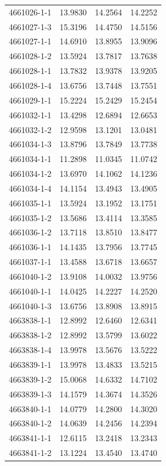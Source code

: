 \begin{longtable}{lrrr}
4661026-1-1 & 13.9830 & 14.2564 & 14.2252 \\
4661027-1-3 & 15.3196 & 14.4750 & 14.5156 \\
4661027-1-1 & 14.6910 & 13.8955 & 13.9096 \\
4661028-1-2 & 13.5924 & 13.7817 & 13.7638 \\
4661028-1-1 & 13.7832 & 13.9378 & 13.9205 \\
4661028-1-4 & 13.6756 & 13.7448 & 13.7551 \\
4661029-1-1 & 15.2224 & 15.2429 & 15.2454 \\
4661032-1-1 & 13.4298 & 12.6894 & 12.6653 \\
4661032-1-2 & 12.9598 & 13.1201 & 13.0481 \\
4661034-1-3 & 13.8796 & 13.7849 & 13.7738 \\
4661034-1-1 & 11.2898 & 11.0345 & 11.0742 \\
4661034-1-2 & 13.6970 & 14.1062 & 14.1236 \\
4661034-1-4 & 14.1154 & 13.4943 & 13.4905 \\
4661035-1-1 & 13.5924 & 13.1952 & 13.1751 \\
4661035-1-2 & 13.5686 & 13.4114 & 13.3585 \\
4661036-1-2 & 13.7118 & 13.8510 & 13.8477 \\
4661036-1-1 & 14.1435 & 13.7956 & 13.7745 \\
4661037-1-1 & 13.4588 & 13.6718 & 13.6657 \\
4661040-1-2 & 13.9108 & 14.0032 & 13.9756 \\
4661040-1-1 & 14.0425 & 14.2227 & 14.2520 \\
4661040-1-3 & 13.6756 & 13.8908 & 13.8915 \\
4663838-1-1 & 12.8992 & 12.6460 & 12.6341 \\
4663838-1-2 & 12.8992 & 13.5799 & 13.6022 \\
4663838-1-4 & 13.9978 & 13.5676 & 13.5222 \\
4663839-1-1 & 13.9978 & 13.4833 & 13.5215 \\
4663839-1-2 & 15.0068 & 14.6332 & 14.7102 \\
4663839-1-3 & 14.1579 & 14.3674 & 14.3526 \\
4663840-1-1 & 14.0779 & 14.2800 & 14.3020 \\
4663840-1-2 & 14.0639 & 14.2456 & 14.2394 \\
4663841-1-1 & 12.6115 & 13.2418 & 13.2343 \\
4663841-1-2 & 13.1224 & 13.4540 & 13.4740 \\

\end{longtable}
